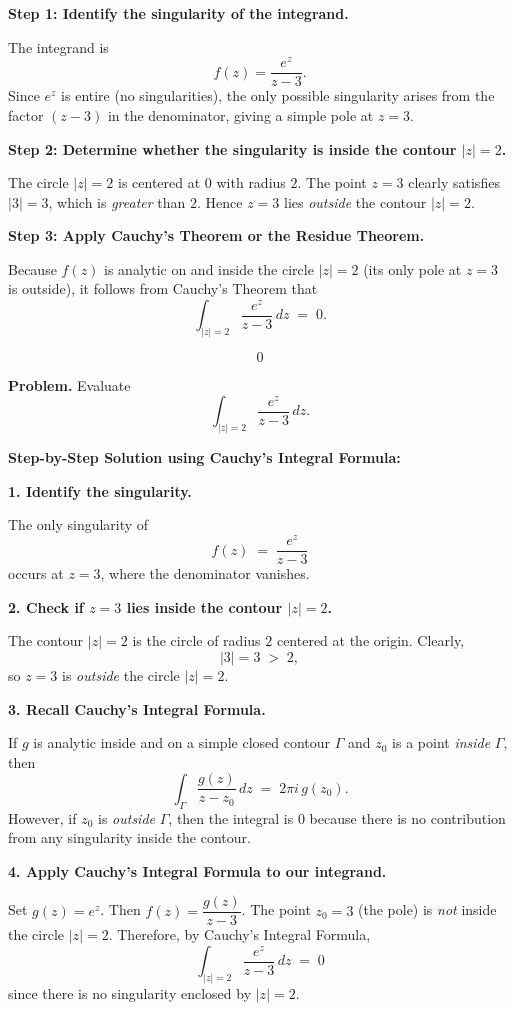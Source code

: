 \documentclass[12pt]{article}
\theoremstyle{definition} %
\theoremstyle{plain} %
\begin{document}
\textbf{Step 1: Identify the singularity of the integrand.}

The integrand is
\[
f(z) = \frac{e^z}{z-3}.
\]
Since \(e^z\) is entire (no singularities), the only possible singularity arises from the factor \((z-3)\) in the denominator, giving a simple pole at \(z = 3\).

\textbf{Step 2: Determine whether the singularity is inside the contour \(\lvert z\rvert=2\).}

The circle \(\lvert z\rvert = 2\) is centered at \(0\) with radius \(2\). The point \(z=3\) clearly satisfies \(\lvert 3\rvert=3\), which is \emph{greater} than \(2\). Hence \(z=3\) lies \emph{outside} the contour \(\lvert z\rvert=2\).

\textbf{Step 3: Apply Cauchy's Theorem or the Residue Theorem.}

Because \(f(z)\) is analytic on and inside the circle \(\lvert z\rvert=2\) (its only pole at \(z=3\) is outside), it follows from Cauchy's Theorem that
\[
\int_{\lvert z\rvert=2} \frac{e^z}{z-3}\,dz 
\;=\; 0.
\]

\[
\boxed{0}
\]

\textbf{Problem.} Evaluate
\[
\int_{\lvert z\rvert=2} \frac{e^z}{z-3}\,dz.
\]

\textbf{Step-by-Step Solution using Cauchy’s Integral Formula:}

\textbf{1. Identify the singularity.}

The only singularity of
\[
f(z) \;=\; \frac{e^z}{z-3}
\]
occurs at \(z=3\), where the denominator vanishes.

\textbf{2. Check if \(z=3\) lies inside the contour \(\lvert z\rvert=2\).}

The contour \(\lvert z\rvert=2\) is the circle of radius \(2\) centered at the origin. Clearly,
\[
|3| = 3 \;>\; 2,
\]
so \(z=3\) is \emph{outside} the circle \(\lvert z\rvert=2\).

\textbf{3. Recall Cauchy’s Integral Formula.}

If \(g\) is analytic inside and on a simple closed contour \(\Gamma\) and \(z_0\) is a point \emph{inside} \(\Gamma\), then
\[
\int_{\Gamma} \frac{g(z)}{z - z_0}\,dz 
\;=\;
2\pi i \,g(z_0).
\]
However, if \(z_0\) is \emph{outside} \(\Gamma\), then the integral is \(0\) because there is no contribution from any singularity inside the contour.

\textbf{4. Apply Cauchy’s Integral Formula to our integrand.}

Set \(g(z) = e^z\). Then \(f(z) = \dfrac{g(z)}{z-3}\). The point \(z_0 = 3\) (the pole) is \emph{not} inside the circle \(\lvert z\rvert=2\). Therefore, by Cauchy’s Integral Formula,
\[
\int_{\lvert z\rvert=2} \frac{e^z}{z-3}\,dz
\;=\; 0
\]
since there is no singularity enclosed by \(\lvert z\rvert=2\).
\end{document}
